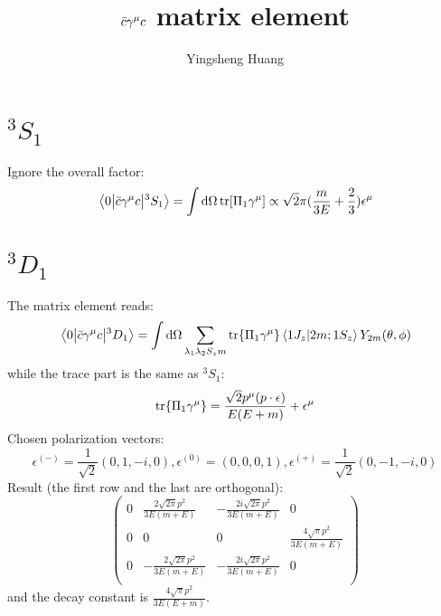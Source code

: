 \documentclass{article}
\title{$\bar c\gm c$ matrix element}
\author{Yingsheng Huang}
\newcommand{\gm}{\gamma^{\mu}}
\newcommand{\la}{\lambda}
\begin{document}
\maketitle
\section{$^3S_1$}
Ignore the overall factor:
$$\mel{0}{\bar c\gm c}{^3S_1}=\int\dd\Omega\tr[\Pi_1\gm]\propto\sqrt{2}\pi(\frac{m}{3 E}+\frac{2}{3})\epsilon^{\mu}$$
\section{$^3D_1$}
The matrix element reads:
$$\mel{0}{\bar c\gm c}{^3D_1}=\int\dd\Omega\sum_{\la_1\la_2 S_zm}\tr{\Pi_1\gm}\braket{1J_z}{2m;1S_z}Y_{2m}(\theta,\phi)$$
while the trace part is the same as $^3S_1$:
$$\tr{\Pi_1\gm}=\frac{\sqrt{2}p^{\mu}(p\cdot\epsilon)}{E(E+m)}+\epsilon^{\mu}$$
Chosen polarization vectors: 
$$\epsilon^{(-)}=\frac{1}{\sqrt{2}}(0,1,-i,0),\epsilon^{(0)}=(0,0,0,1),\epsilon^{(+)}=\frac{1}{\sqrt{2}}(0,-1,-i,0)$$
Result (the first row and the last are orthogonal):  
$$\left(
\begin{array}{cccc}
 0 & \frac{2 \sqrt{2 \pi } p^2}{3 E (m+E)} & -\frac{2 i \sqrt{2 \pi } p^2}{3 E (m+E)} & 0 \\
 0 & 0 & 0 & \frac{4 \sqrt{\pi } p^2}{3 E (m+E)} \\
 0 & -\frac{2 \sqrt{2 \pi } p^2}{3 E (m+E)} & -\frac{2 i \sqrt{2 \pi } p^2}{3 E (m+E)} & 0 \\
\end{array}
\right)$$
and the decay constant is $\frac{4 \sqrt{\pi } p^2}{3 E (E+m)}$.
\end{document}
